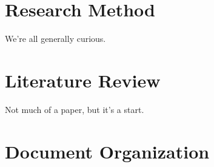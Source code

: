 \documentclass[12pt,a4paper,twoside,onecolumn,titlepage]{report}
\begin{document}
\section{Research Method}
We're all generally curious.

\section{Literature Review}
Not much of a paper, but it's a start.

\section{Document Organization}
\end{document}
